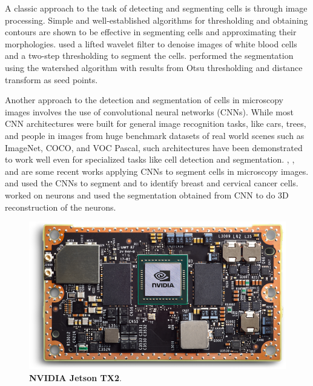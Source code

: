 \documentclass[10pt, journal, compsoc]{IEEEtran}
\begin{document}
A classic approach to the task of detecting and segmenting cells is through image processing. Simple and well-established algorithms for thresholding and obtaining contours are shown to be effective in segmenting cells and approximating their morphologies. \cite{5775215} used a lifted wavelet filter to denoise images of white blood cells and a two-step thresholding to segment the cells. \cite{7407919} performed the segmentation using the watershed algorithm with results from Otsu thresholding and distance transform as seed points.

Another approach to the detection and segmentation of cells in microscopy images involves the use of convolutional neural networks (CNNs). While most CNN architectures were built for general image recognition tasks, like cars, trees, and people in images from huge benchmark datasets of real world scenes such as ImageNet, COCO, and VOC Pascal, such architectures have been demonstrated to work well even for specialized tasks like cell detection and segmentation. \cite{8264783}, \cite{7932065}, and  \cite{7874113} are some recent works applying CNNs to segment cells in microscopy images. \cite{8264783} and  \cite{7932065} used the CNNs to segment and to identify breast and cervical cancer cells. \cite{7874113} worked on neurons and used the segmentation obtained from CNN to do 3D reconstruction of the neurons.

\begin{figure}
\includegraphics[width=\linewidth]{jetson.png}
\caption{\textbf{NVIDIA Jetson TX2}.}
\label{fig:jetson}
\end{figure}
\end{document}
